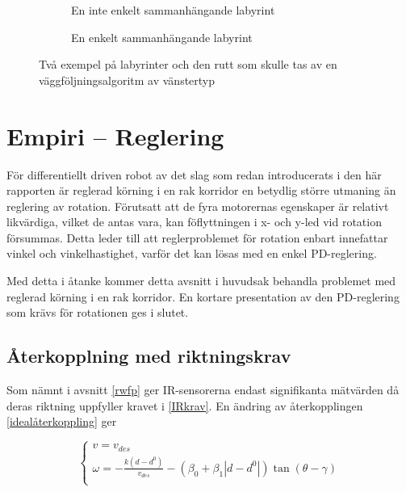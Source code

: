 \documentclass[11pt]{article}
\begin{document}
\begin{flushleft}
\begin{figure}[htbp]
	\centering
	\begin{subfigure}{.5\linewidth}
		\centering
		\noindent\resizebox{.5\textwidth}{!}{
			}
		\caption{En inte enkelt sammanhängande labyrint}	
		\label{non-connected}
	\end{subfigure}%
	\begin{subfigure}{.5\linewidth}
		\centering
		\noindent\resizebox{.5\textwidth}{!}{
			}
		\caption{En enkelt sammanhängande labyrint}	
	\end{subfigure}%
	\caption{Två exempel på labyrinter och den rutt som skulle tas av en väggföljningsalgoritm av vänstertyp}
	\label{maze}
\end{figure}%



\pagebreak
\section{Empiri -- Reglering}
För differentiellt driven robot av det slag som redan introducerats i den här rapporten är reglerad körning i en rak korridor en betydlig större utmaning än reglering av rotation. Förutsatt att de fyra motorernas egenskaper är relativt likvärdiga, vilket de antas vara, kan föflyttningen i x- och y-led vid rotation försummas. Detta leder till att reglerproblemet för rotation enbart innefattar vinkel och vinkelhastighet, varför det kan lösas med en enkel PD-reglering.

Med detta i åtanke kommer detta avsnitt i huvudsak behandla problemet med reglerad körning i en rak korridor. En kortare presentation av den PD-reglering som krävs för rotationen ges i slutet.

\subsection{Återkopplning med riktningskrav}
Som nämnt i avsnitt \ref{rwfp} ger IR-sensorerna endast signifikanta mätvärden då deras riktning uppfyller kravet i \eqref{IRkrav}. En ändring av återkopplingen \eqref{idealåterkoppling} ger

\begin{equation}\label{IRåterkoppling}
	\begin{cases}
	v = v_{des} \\
	\omega = - \frac{k(d-d^0)} {v_{des}} - (\beta_0 + \beta_1 |d - d^0|) \tan(\theta - \gamma) \\
	\end{cases}
\end{equation}


\end{flushleft}
\end{document}
